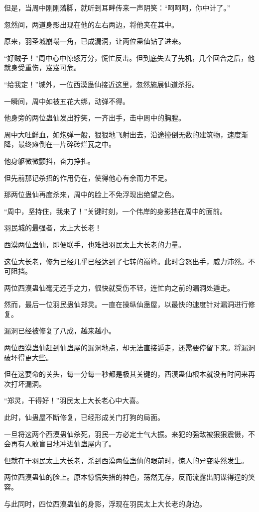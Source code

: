 \begin{this_body}
但是，当周中刚刚落脚，就听到耳畔传来一声阴笑：“呵呵呵，你中计了。”

忽然间，两道身影出现在他的左右两边，将他夹在其中。

原来，羽圣城崩塌一角，已成漏洞，让两位蛊仙钻了进来。

“好贼子！”周中心中惊怒万分，慌忙反击。但到底失去了先机，几个回合之后，他就身受重伤，岌岌可危。

“给我定！”城外，一位西漠蛊仙接近这里，忽然施展仙道杀招。

一瞬间，周中如被五花大绑，动弹不得。

他身旁的两位蛊仙发出狞笑，一齐出手，击中周中的胸膛。

周中大吐鲜血，如炮弹一般，狠狠地飞射出去，沿途撞倒无数的建筑物，速度渐降，最终瘫倒在一片碎砖烂瓦之中。

他身躯微微颤抖，奋力挣扎。

但先前那记杀招的作用仍在，使得他心有余而力不足。

那两位蛊仙再度杀来，周中的脸上不免浮现出绝望之色。

“周中，坚持住，我来了！”关键时刻，一个伟岸的身影挡在周中的面前。

羽民城的最强者，太上大长老！

西漠两位蛊仙，即便联手，也难挡羽民太上大长老的力量。

这位大长老，修为已经几乎已经达到了七转的巅峰。此时含怒出手，威力沛然。不可阻挡。

两位西漠蛊仙毫无还手之力，很快就受伤不轻，连忙向之前的漏洞处遁走。

然而，最后一位羽民蛊仙郑灵。一直在操纵仙蛊屋，以最快的速度针对漏洞进行修复。

漏洞已经被修复了八成，越来越小。

两位西漠蛊仙赶到仙蛊屋的漏洞地点，却无法直接遁走，还需要停留下来。将漏洞破坏得更大些。

但在这要命的关头，每一分每一秒都是极其关键的，西漠蛊仙根本就没有时间来再次打坏漏洞。

“郑灵，干得好！”羽民太上大长老心中大喜。

此时，仙蛊屋不断修复，已经形成关门打狗的局面。

一旦将这两个西漠蛊仙杀死，羽民一方必定士气大振。来犯的强敌被狠狠震慑，不会再有人敢盲目地冲进仙蛊屋内了。

但就在于羽民太上大长老，杀到西漠两位蛊仙的眼前时，惊人的异变陡然发生。

两位西漠蛊仙的脸上。原本惊慌失措的神色，荡然无存，反而流露出阴谋得逞的笑容。

与此同时，四位西漠蛊仙的身影，浮现在羽民太上大长老的身边。


\end{this_body}
